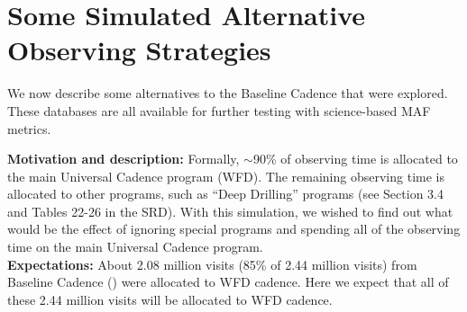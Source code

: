 \navigationbar









\section{Some Simulated Alternative Observing Strategies}
\def\secname{cadexp:alternatives}\label{sec:\secname}

We now describe some alternatives to the Baseline Cadence that were
explored. These \OpSim databases are all available for further testing
with science-based MAF metrics.



{\bf Motivation and description:} Formally, $\sim$90\% of observing
time is allocated to the main Universal Cadence program (WFD). The
remaining observing time is allocated to other programs, such as
``Deep Drilling'' programs (see Section 3.4 and Tables 22-26  in the
SRD). With this simulation, we wished to find out what would be the
effect of ignoring special programs and spending all of the observing
time on the main Universal Cadence program. \\

{\bf Expectations:} About 2.08 million visits (85\% of 2.44 million
visits) from Baseline Cadence () were allocated
to WFD cadence. Here we expect that all of these 2.44 million visits
will be allocated to WFD cadence. \\

